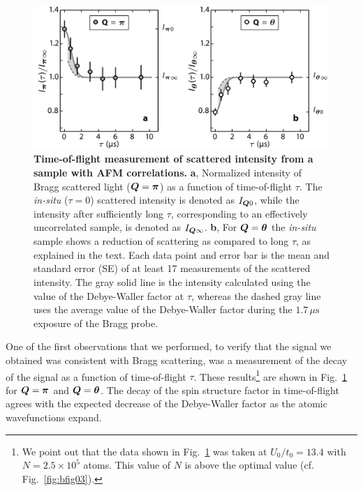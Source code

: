 \begin{figure}
\centering\includegraphics[width=0.8\columnwidth]{../figures/afmpaper/Hulet_fig2.png}
%
\caption{\textbf{Time-of-flight measurement of scattered intensity from a
sample with AFM correlations.}
\textbf{a}, Normalized intensity of Bragg scattered light
($\bm{Q}=\bm{\pi}$) as a function of time-of-flight $\tau$.  The
\textit{in-situ} ($\tau=0$) scattered intensity is denoted as $I_{\bm{Q}0}$,
while the intensity after sufficiently long $\tau$, corresponding to an
effectively uncorrelated sample, is denoted as $I_{\bm{Q}\infty}$.
\textbf{b}, For $\bm{Q}=\bm{\theta}$  the \textit{in-situ}  sample shows
a reduction of scattering as compared to long $\tau$, as explained in the text.
Each data point and error bar is the mean and standard error (SE) of at least
17 measurements of the scattered intensity.  The gray solid line is the
intensity calculated using the value of the Debye-Waller factor at $\tau$,
whereas the dashed gray line uses the average value of the Debye-Waller factor
during the $1.7\,\mu\text{s}$ exposure of the Bragg probe.}
\label{fig:bfig2}	
\end{figure}

One of the first observations that we performed, to verify that the signal we
obtained was consistent with Bragg scattering, was a measurement of the decay
of the signal as a function of time-of-flight $\tau$.  These
results\footnote{We point out that the data shown in Fig.~\ref{fig:bfig2} was
taken at $U_{0}/t_{0}=13.4$ with $N=2.5\times10^{5}$ atoms. This value of $N$
is above the optimal value (cf. Fig.~\ref{fig:bfig03}).}  are shown in
Fig.~\ref{fig:bfig2} for $\bm{Q}=\bm{\pi}$ and $\bm{Q}=\bm{\theta}$.  The decay
of the spin structure factor in time-of-flight agrees with the expected
decrease of the Debye-Waller factor as the atomic wavefunctions expand.


